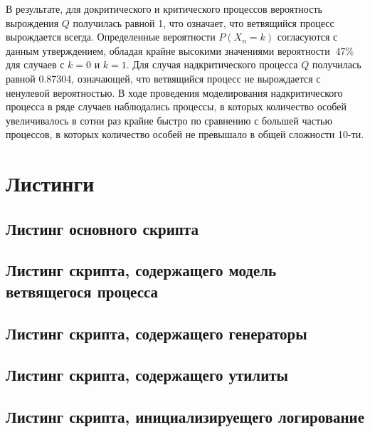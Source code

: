 В результате, для докритического и критического процессов вероятность вырождения $Q$ получилась равной 1, что означает,
что ветвящийся процесс вырождается всегда. Определенные вероятности $P(X_n=k)$ согласуются с данным утверждением, обладая
крайне высокими значениями вероятности $~47\%$ для случаев с $k=0$ и $k=1$.
Для случая надкритического процесса $Q$ получилась равной 0.87304, означающей, что ветвящийся процесс не вырождается с
ненулевой вероятностью. В ходе проведения моделирования надкритического процесса в ряде случаев наблюдались процессы,
в которых количество особей увеличивалось в сотни раз крайне быстро по сравнению с большей частью процессов, в которых
количество особей не превышало в общей сложности 10-ти.

\section*{Листинги}

\subsection*{Листинг основного скрипта}


\subsection*{Листинг скрипта, содержащего модель ветвящегося процесса}


\subsection*{Листинг скрипта, содержащего генераторы}


\subsection*{Листинг скрипта, содержащего утилиты}


\subsection*{Листинг скрипта, инициализируещего логирование}

